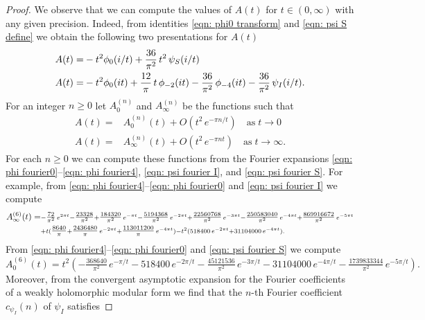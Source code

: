 \begin{proof}
  \noindent We observe that we can compute the values of $A(t)$ for $t\in(0,\infty)$ with any given precision. Indeed, from identities \eqref{eqn: phi0 transform} and \eqref{eqn: psi S define} we obtain the following two presentations for $A(t)$
  \begin{align}
   A(t)=&-t^2\phi_0(i/t)+\frac{36}{\pi^2}\,t^2\,\psi_S(i/t)\notag\\
   A(t)=&-t^2\phi_0(it)+\frac{12}{\pi}\,t\,\phi_{-2}(it)-\frac{36}{\pi^2}\,\phi_{-4}(it)-\frac{36}{\pi^2}\,\psi_I(i/t).\notag
  \end{align}
  For an integer $n\geq0$ let $A_0^{(n)}$ and  $A_{\infty}^{(n)}$ be the functions such that
  \begin{align}
   A(t)=&A_0^{(n)}(t)+O(t^2\,e^{-\pi n /t})\quad\mbox{as}\;t\to0\label{eqn: A asymptotic expansion 0}\\
   A(t)=&A_\infty^{(n)}(t)+O(t^2\,e^{-\pi n t})\quad\mbox{as}\;t\to\infty.\label{eqn: A asymptotic expansion infty}
  \end{align}
  For each $n\geq 0$ we can compute these functions from the Fourier expansions \eqref{eqn: phi fourier0}--\eqref{eqn: phi fourier4}, \eqref{eqn: psi fourier I}, and \eqref{eqn: psi fourier S}.
   For example, from \eqref{eqn: phi fourier4}--\eqref{eqn: phi fourier0} and \eqref{eqn: psi fourier I} we compute
  \begin{align}A_\infty^{(6)}(t)=&\scriptstyle-\tfrac{72}{\pi ^2}\, e^{2 \pi  t}-\tfrac{23328}{\pi ^2}+\tfrac{184320}{\pi ^2}\, e^{-\pi  t}-\tfrac{5194368}{\pi ^2}\, e^{-2 \pi  t}+\tfrac{22560768}{\pi ^2}\, e^{-3 \pi  t}-\tfrac{250583040}{\pi
     ^2}\, e^{-4 \pi  t}+\tfrac{869916672 }{\pi ^2}\,e^{-5 \pi  t}\notag\\&\scriptstyle+t(\tfrac{8640}{\pi }+\tfrac{2436480}{\pi }\, e^{-2 \pi  t}+\tfrac{113011200 }{\pi }\,e^{-4 \pi  t})-t^2(518400\,e^{-2 \pi  t}+31104000\,e^{-4 \pi  t}).\notag
  \end{align}
  From \eqref{eqn: phi fourier4}--\eqref{eqn: phi fourier0} and \eqref{eqn: psi fourier S} we compute
  $$A_0^{(6)}(t)=t^2(-\tfrac{368640}{\pi ^2}\, e^{-\pi/t}-518400\, e^{-2\pi/t}-\tfrac{45121536}{\pi ^2}\, e^{-3\pi/t}-31104000\,e^{-4\pi/t}-\tfrac{1739833344}{\pi ^2}\, e^{-5\pi/t}).$$
  Moreover, from the convergent asymptotic expansion for the Fourier coefficients of a weakly holomorphic modular form \cite[Proposition 1.12]{Bruinier} we find that the $n$-th Fourier coefficient $c_{\psi_I}(n)$ of $\psi_I$ satisfies

\end{proof}
